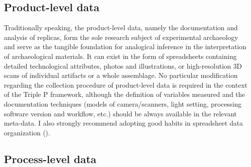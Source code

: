 \documentclass[
  11pt,
  letterpaper,
  DIV=11,
  numbers=noendperiod]{scrartcl}
\begin{document}
\subsection{Product-level data}\label{product-level-data}

Traditionally speaking, the product-level data, namely the documentation
and analysis of replicas, form the sole research subject of experimental
archaeology and serve as the tangible foundation for analogical
inference in the interpretation of archaeological materials. It can
exist in the form of spreadsheets containing detailed technological
attributes, photos and illustrations, or high-resolution 3D scans of
individual artifacts or a whole assemblage. No particular modification
regarding the collection procedure of product-level data is required in
the context of the Triple P framework, although the definition of
variables measured and the documentation techniques (models of
camera/scanners, light setting, processing software version and
workflow, etc.) should be always available in the relevant meta-data. I
also strongly recommend adopting good habits in spreadsheet data
organization ().

\subsection{Process-level data}\label{process-level-data}
\end{document}
